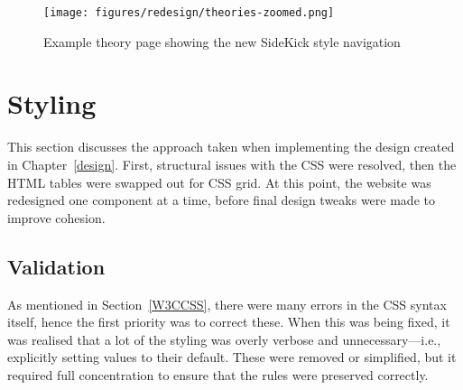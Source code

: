 \documentclass[bsc,frontabs,oneside,singlespacing,parskip,deptreport,logo]{infthesis}
\begin{document}



\begin{figure}[h]
    \centering
    \texttt{[image: figures/redesign/theories-zoomed.png]}
    \caption{Example theory page showing the new SideKick style navigation}
    \label{fig:theory-redesign}
\end{figure}

\section{Styling}

This section discusses the approach taken when implementing the design created in Chapter~\ref{design}. First, structural issues with the CSS were resolved, then the HTML tables were swapped out for CSS grid. At this point, the website was redesigned one component at a time, before final design tweaks were made to improve cohesion. 

\subsection{Validation}

As mentioned in Section~\ref{W3CCSS}, there were many errors in the CSS syntax itself, hence the first priority was to correct these. When this was being fixed, it was realised that a lot of the styling was overly verbose and unnecessary---i.e., explicitly setting values to their default. These were removed or simplified, but it required full concentration to ensure that the rules were preserved correctly. 
\end{document}
